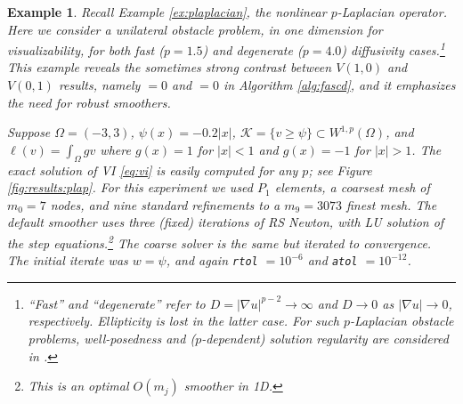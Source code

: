 \documentclass[letterpaper,final,12pt,reqno]{amsart}
\theoremstyle{cstyle}
\theoremstyle{cstyle*}
\theoremstyle{dstyle}
\newtheorem{example}[theorem]{Example}
\numberwithin{equation}{section}
\numberwithin{figure}{section}
\numberwithin{table}{section}
\numberwithin{theorem}{section}
\newcommand{\grad}{\nabla}
\begin{document}
\begin{example}  \label{ex:results:plap}
Recall Example \ref{ex:plaplacian}, the nonlinear $p$-Laplacian operator.  Here we consider a unilateral obstacle problem, in one dimension for visualizability, for both fast ($p=1.5$) and degenerate ($p=4.0$) diffusivity cases.\footnote{``Fast'' and ``degenerate'' refer to $D=|\grad u|^{p-2}\to \infty$ and $D\to 0$ as $|\grad u|\to 0$, respectively.  Ellipticity is lost in the latter case.  For such $p$-Laplacian obstacle problems, well-posedness and ($p$-dependent) solution regularity are considered in \cite{ChoeLewis1991}.}  This example reveals the sometimes strong contrast between $V(1,0)$ and $V(0,1)$ results, namely  $=0$ and  $=0$ in Algorithm \ref{alg:fascd}, and it emphasizes the need for robust smoothers.

Suppose $\Omega=(-3,3)$, $\psi(x) = -0.2|x|$, $\mathcal{K} = \{v \ge \psi\} \subset W^{1,p}(\Omega)$, and $\ell(v) = \int_\Omega g v$ where $g(x)=1$ for $|x|<1$ and $g(x)=-1$ for $|x|>1$.  The exact solution of VI \eqref{eq:vi} is easily computed for any $p$; see Figure \ref{fig:results:plap}.  For this experiment we used $P_1$ elements, a coarsest mesh of $m_0=7$ nodes, and nine standard refinements to a $m_9=3073$ finest mesh.  The default smoother uses three (fixed) iterations of RS Newton, with LU solution of the step equations.\footnote{This is an optimal $O(m_j)$ smoother in 1D.}  The coarse solver is the same but iterated to convergence.  The initial iterate was $w=\psi$, and again \texttt{rtol} $= 10^{-6}$ and \texttt{atol} $= 10^{-12}$.


\end{example}
\end{document}
